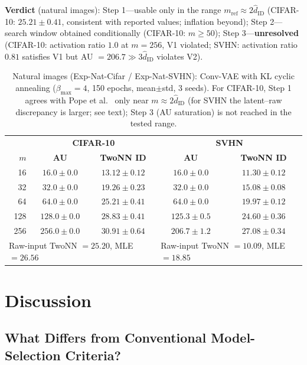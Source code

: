 \documentclass[make,article,submit,pdftex,moreauthors]{Definitions/mdpi}
\newcommand{\hatdID}{\hat{d}_{\mathrm{ID}}}
\begin{document}
\textbf{Verdict} (natural images):
Step 1---usable only in the range $m_{\mathrm{ref}} \approx 2\hatdID$
(CIFAR-10: $25.21 \pm 0.41$, consistent with reported values; inflation
beyond);
Step 2---search window obtained conditionally (CIFAR-10: $m \geq 50$);
Step 3---\textbf{unresolved} (CIFAR-10: activation ratio $1.0$ at $m = 256$,
V1 violated; SVHN: activation ratio $0.81$ satisfies V1 but
AU $= 206.7 \gg 3\hatdID$ violates V2).

\begin{table}[H]
\caption{Natural images (Exp-Nat-Cifar / Exp-Nat-SVHN): Conv-VAE with KL
cyclic annealing ($\beta_{\max} = 4$, 150 epochs, mean$\pm$std, 3 seeds).
For CIFAR-10, Step 1 agrees with Pope et al.~\cite{pope2021intrinsic} only
near $m \approx 2\hatdID$ (for SVHN the latent--raw discrepancy is larger;
see text); Step 3 (AU saturation) is not reached in the tested range.}
\label{tab:natural}
\small
\begin{tabular}{r cc | cc}
\toprule
 & \multicolumn{2}{c|}{\textbf{CIFAR-10}} & \multicolumn{2}{c}{\textbf{SVHN}} \\
$m$ & \textbf{AU} & \textbf{TwoNN ID} & \textbf{AU} & \textbf{TwoNN ID} \\
\midrule
 16 & $16.0 \pm 0.0$ & $13.12 \pm 0.12$ & $16.0 \pm 0.0$ & $11.30 \pm 0.12$ \\
 32 & $32.0 \pm 0.0$ & $19.26 \pm 0.23$ & $32.0 \pm 0.0$ & $15.08 \pm 0.08$ \\
 64 & $64.0 \pm 0.0$ & $\mathbf{25.21 \pm 0.41}$ & $64.0 \pm 0.0$ & $19.97 \pm 0.12$ \\
128 & $128.0 \pm 0.0$ & $28.83 \pm 0.41$ & $125.3 \pm 0.5$ & $24.60 \pm 0.36$ \\
256 & $256.0 \pm 0.0$ & $30.91 \pm 0.64$ & $206.7 \pm 1.2$ & $27.08 \pm 0.34$ \\
\midrule
\multicolumn{3}{l|}{Raw-input TwoNN $= 25.20$, MLE $= 26.56$} &
\multicolumn{2}{l}{Raw-input TwoNN $= 10.09$, MLE $= 18.85$} \\
\bottomrule
\end{tabular}
\end{table}

\section{Discussion}\label{sec:discussion}

\subsection{What Differs from Conventional Model-Selection Criteria?}\label{sec:disc_model_selection}
\end{document}
